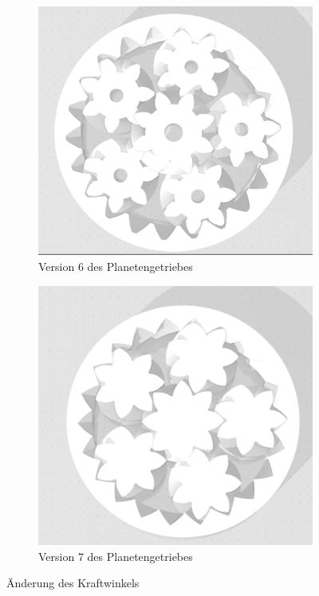 \begin{figure}[!ht]
	\centering
	\begin{subfigure}[b]{0.4\textwidth}
		\includegraphics[width=\textwidth]{bilder/GetriebeVersion4-3.png}
		\caption{Version 6 des Planetengetriebes}
		\label{bild:gearversion4-3}
	\end{subfigure}
	\begin{subfigure}[b]{0.4\textwidth}
		\includegraphics[width=\textwidth]{bilder/GetriebeVersion4-4.png}
		\caption{Version 7 des Planetengetriebes}
		\label{bild:gearversion4-4}
	\end{subfigure}
	\caption{Änderung des Kraftwinkels}
\end{figure}

